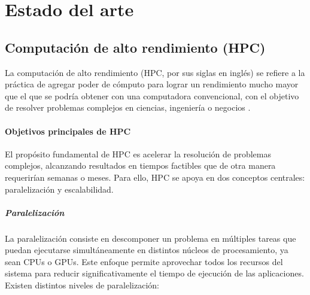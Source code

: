 \chapter{Estado del arte}\label{cap:estado_del_arte}



\section{Computación de alto rendimiento (\acs{HPC})}\label{sec:computacion_alto_rendimiento}

La computación de alto rendimiento (\acs{HPC}, por sus siglas en inglés) se refiere a la práctica de agregar poder de cómputo para lograr un rendimiento mucho mayor que el que se podría obtener con una computadora convencional, con el objetivo de resolver problemas complejos en ciencias, ingeniería o negocios \cite{sravanthi2014hpc}.

\subsubsection{Objetivos principales de HPC}

El propósito fundamental de HPC es acelerar la resolución de problemas complejos, alcanzando resultados en tiempos factibles que de otra manera requerirían semanas o meses. Para ello, HPC se apoya en dos conceptos centrales: paralelización y escalabilidad.

\paragraph{Paralelización}
La paralelización consiste en descomponer un problema en múltiples tareas que puedan ejecutarse simultáneamente en distintos núcleos de procesamiento, ya sean CPUs o GPUs. Este enfoque permite aprovechar todos los recursos del sistema para reducir significativamente el tiempo de ejecución de las aplicaciones. Existen distintos niveles de paralelización:

